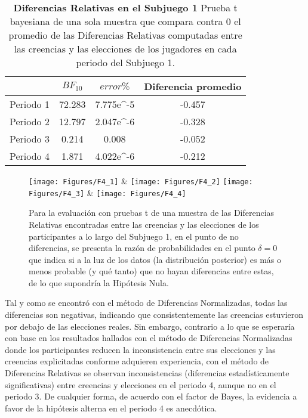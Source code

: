 \begin{table}[h]
\caption[Diferencias Relativas en el Subjuego 1 (prueba t de una muestra)]{\textbf{Diferencias Relativas en el Subjuego 1} Prueba t bayesiana de una sola muestra que compara contra 0 el promedio de las Diferencias Relativas computadas entre las creencias y las elecciones de los jugadores en cada periodo del Subjuego 1.}
\label{DR-S1-B}
\centering
\begin{tabular}{l | c c | c}
\toprule
\textbf{} & \textbf{$BF_{10}$} & \textbf{$error\%$} & \textbf{Diferencia promedio}\\
\midrule
Periodo 1 & 72.283 & 7.775e^-5 & -0.457\\
Periodo 2 & 12.797 & 2.047e^-6 & -0.328\\
Periodo 3 & 0.214 & 0.008 & -0.052\\
Periodo 4 & 1.871 & 4.022e^-6 & -0.212\\
\bottomrule
\end{tabular}
\end{table}
	


\begin{figure}[h]
\centering
\texttt{[image: Figures/F4\_1]} & \texttt{[image: Figures/F4\_2]} 
\texttt{[image: Figures/F4\_3]} & \texttt{[image: Figures/F4\_4]} 
\decoRule
\caption[Diferencias Relativas entre creencias y elecciones en el Subjuego 1 (Factor de Bayes)]{Para la evaluación con pruebas t de una muestra de las Diferencias Relativas encontradas entre las creencias y las elecciones de los participantes a lo largo del Subjuego 1, en el punto de no diferencias, se presenta la razón de probabilidades en el punto $\delta = 0$ que indica si a la luz de los datos (la distribución posterior) es más o menos probable (y qué tanto) que no hayan diferencias entre estas, de lo que supondría la Hipótesis Nula.}
\label{fig:DR_S1}
\end{figure}

Tal y como se encontró con el método de Diferencias Normalizadas, todas las diferencias son negativas, indicando que consistentemente las creencias estuvieron por debajo de las elecciones reales. Sin embargo, contrario a lo que se esperaría con base en los resultados hallados con el método de Diferencias Normalizadas donde los participantes reducen la inconsistencia entre sus elecciones y las creencias explicitadas conforme adquieren experiencia, con el método de Diferencias Relativas se observan inconsistencias (diferencias estadísticamente significativas) entre creencias y elecciones en el periodo 4, aunque no en el periodo 3. De cualquier forma, de acuerdo con el factor de Bayes, la evidencia a favor de la hipótesis alterna en el periodo 4 es anecdótica.\\

